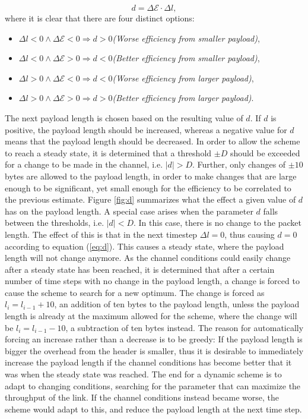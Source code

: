 \begin{equation}
d = \Delta \mathcal{E}\cdot\Delta l,\label{eq:d}
\end{equation}
where it is clear that there are four distinct options:
\begin{itemize}  
\setlength{\itemsep}{1pt}
\setlength{\parskip}{0pt}
\setlength{\parsep}{0pt}
\item[ ] $\Delta l < 0 \wedge \Delta \mathcal{E} < 0 \Rightarrow d > 0$\quad \textit{(Worse efficiency from smaller payload)},
\item[ ] $\Delta l < 0 \wedge \Delta \mathcal{E} > 0 \Rightarrow d < 0$\quad \textit{(Better efficiency from smaller payload)},
\item[ ] $\Delta l > 0 \wedge \Delta \mathcal{E} < 0 \Rightarrow d < 0$\quad \textit{(Worse efficiency from larger payload)},
\item[ ] $\Delta l > 0 \wedge \Delta \mathcal{E} > 0 \Rightarrow d > 0$\quad \textit{(Better efficiency from larger payload)}.
\end{itemize}
The next payload length is chosen based on the resulting value of $d$. If $d$ is positive, the payload length should be increased, whereas a negative value for $d$ means that the payload length should be decreased. In order to allow the scheme to reach a steady state, it is determined that a threshold $\pm D$ should be exceeded for a change to be made in the channel, i.e. $|d| > D$. Further, only changes of $\pm 10$ bytes are allowed to the payload length, in order to make changes that are large enough to be significant, yet small enough for the efficiency to be correlated to the previous estimate. Figure \ref{fig:d} summarizes what the effect a given value of $d$ has on the payload length.
A special case arises when the parameter $d$ falls between the thresholds, i.e. $|d| < D$. In this case, there is no change to the packet length. The effect of this is that in the next timestep $\Delta l= 0$, thus causing $d = 0$ according to equation (\ref{eq:d}). This causes a steady state, where the payload length will not change anymore. As the channel conditions could easily change after a steady state has been reached, it is determined that after a certain number of time steps with no change in the payload length, a change is forced to cause the scheme to search for a new optimum.
The change is forced as $l_i = l_{i-1} + 10$, an addition of ten bytes to the payload length, unless the payload length is already at the maximum allowed for the scheme, where the change will be $l_i = l_{i-1} -10$, a subtraction of ten bytes instead. The reason for automatically forcing an increase rather than a decrease is to be greedy: If the payload length is bigger the overhead from the header is smaller, thus it is desirable to immediately increase the payload length if the channel conditions has become better that it was when the steady state was reached. The end for a dynamic scheme is to adapt to changing conditions, searching for the parameter that can maximize the throughput of the link. If the channel conditions instead became worse, the scheme would adapt to this, and reduce the payload length at the next time step. 
